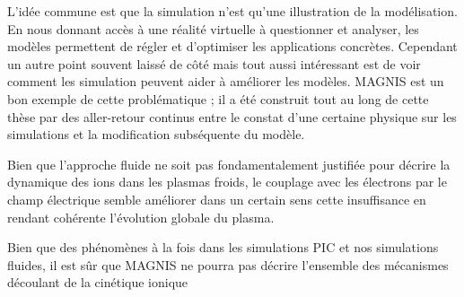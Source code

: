 L'idée commune est que la simulation n'est qu'une illustration de la
modélisation. En nous donnant accès à une réalité virtuelle à questionner et
analyser, les modèles permettent de régler et d'optimiser les applications
concrètes. Cependant un autre point souvent laissé de côté mais tout aussi
intéressant est de voir comment les simulation peuvent aider à améliorer les
modèles. MAGNIS est un bon exemple de cette problématique ; il a été construit
tout au long de cette thèse par des aller-retour continus entre le constat d'une
certaine physique sur les simulations et la modification subséquente du modèle.


Bien que
l'approche fluide ne soit pas fondamentalement justifiée pour décrire la
dynamique des ions dans les plasmas froids, le couplage avec les électrons par
le champ électrique semble améliorer dans un certain sens cette insuffisance en
rendant cohérente l'évolution globale du plasma.

Bien que des phénomènes à la fois dans les
simulations PIC et nos simulations fluides, il est sûr que MAGNIS ne
pourra pas décrire l'ensemble des mécanismes découlant de la cinétique ionique

